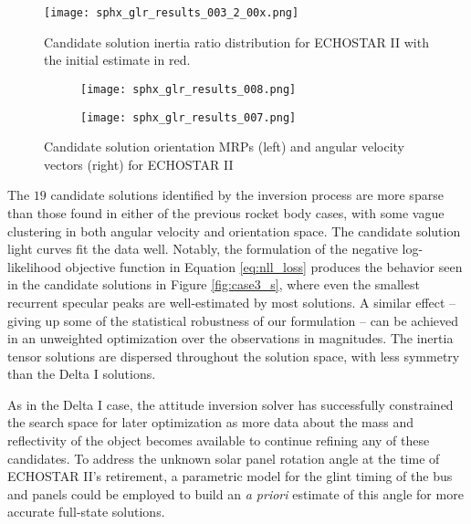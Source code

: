 \documentclass[a4paper,twocolumn]{spaceDebrisC} %
\newcommand{\figsmall}[0]{0.3\textwidth}
\begin{document}
\begin{figure}[H]
  \centering
  \texttt{[image: sphx\_glr\_results\_003\_2\_00x.png]}
  \caption{Candidate solution inertia ratio distribution for ECHOSTAR II with the initial estimate in red.}
  \label{fig:case3_i}
\end{figure}

\begin{figure}[H]
  \centering
  \begin{subfigure}[t]{0.23\textwidth}
    \centering
    \texttt{[image: sphx\_glr\_results\_008.png]}
    \caption{}
    \label{fig:case3_pwa}
  \end{subfigure}
  \hfill
  \begin{subfigure}[t]{0.23\textwidth}
    \centering
    \texttt{[image: sphx\_glr\_results\_007.png]}
    \caption{}
    \label{fig:case3_pwb}
  \end{subfigure}

  \caption{Candidate solution orientation MRPs (left) and angular velocity vectors (right) for ECHOSTAR II}
  \label{fig:case3_pw}
\end{figure}

The $19$ candidate solutions identified by the inversion process are more sparse than those found in either of the previous rocket body cases, with some vague clustering in both angular velocity and orientation space. The candidate solution light curves fit the data well. Notably, the formulation of the negative log-likelihood objective function in Equation \ref{eq:nll_loss} produces the behavior seen in the candidate solutions in Figure \ref{fig:case3_s}, where even the smallest recurrent specular peaks are well-estimated by most solutions. A similar effect -- giving up some of the statistical robustness of our formulation -- can be achieved in an unweighted optimization over the observations in magnitudes. The inertia tensor solutions are dispersed throughout the solution space, with less symmetry than the Delta I solutions. 

As in the Delta I case, the attitude inversion solver has successfully constrained the search space for later optimization as more data about the mass and reflectivity of the object becomes available to continue refining any of these candidates. To address the unknown solar panel rotation angle at the time of ECHOSTAR II's retirement, a parametric model for the glint timing of the bus and panels could be employed to build an \textit{a priori} estimate of this angle for more accurate full-state solutions.
\end{document}
